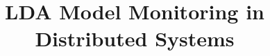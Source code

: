 \documentclass{sig-alternate-05-2015}
\begin{document}
\nocite{*}






%
\title{LDA Model Monitoring in Distributed Systems}%
%
%
%
%
%
\end{document}
